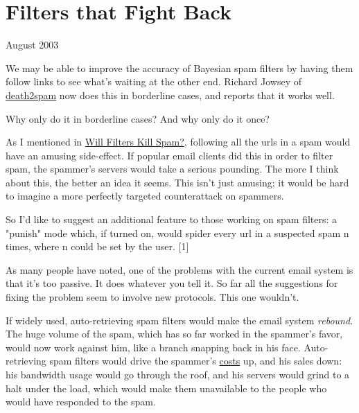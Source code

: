 \chapter{Filters that Fight Back}


            
              
                

August 2003


                  We may be able to improve the accuracy of Bayesian spam
                  filters by having them follow links to see what's waiting at
                  the other end. Richard Jowsey of
                  \href{http://death2spam.com}{death2spam} now does this
                  in borderline cases, and reports that it works well.

Why
                  only do it in borderline cases? And why only do it once?

As
                  I mentioned in
                  \href{http://www.paulgraham.com/wfks.html}{Will Filters Kill Spam?}, following all
                  the urls in a spam would have an amusing side-effect. If
                  popular email clients did this in order to filter spam, the
                  spammer's servers would take a serious pounding. The more I
                  think about this, the better an idea it seems. This isn't just
                  amusing; it would be hard to imagine a more perfectly targeted
                  counterattack on spammers.

So I'd like to suggest
                  an additional feature to those working on spam filters: a
                  "punish" mode which, if turned on, would spider every url in a
                  suspected spam n times, where n could be set by the user.
                  [1]

As many people have noted, one of the problems
                  with the current email system is that it's too passive. It
                  does whatever you tell it. So far all the suggestions for
                  fixing the problem seem to involve new protocols. This one
                  wouldn't.

If widely used, auto-retrieving spam
                  filters would make the email system \emph{rebound.} The huge
                  volume of the spam, which has so far worked in the spammer's
                  favor, would now work against him, like a branch snapping back
                  in his face. Auto-retrieving spam filters would drive the
                  spammer's
                  \href{http://www.bork.ca/pics/?path=incoming\&img=bill.jpg}{costs}
                  up, and his sales down: his bandwidth usage would go through
                  the roof, and his servers would grind to a halt under the
                  load, which would make them unavailable to the people who
                  would have responded to the spam.

